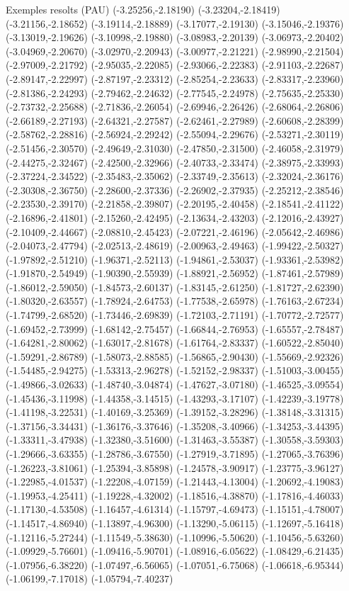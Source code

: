 \documentclass[11pt,a4paper]{article}
\begin{document}
\begin{fmex}{Exemples resolts (PAU)}
(-3.25256,-2.18190) (-3.23204,-2.18419) (-3.21156,-2.18652) (-3.19114,-2.18889) (-3.17077,-2.19130) (-3.15046,-2.19376) (-3.13019,-2.19626) (-3.10998,-2.19880) (-3.08983,-2.20139) (-3.06973,-2.20402) (-3.04969,-2.20670) (-3.02970,-2.20943) (-3.00977,-2.21221) (-2.98990,-2.21504) (-2.97009,-2.21792) (-2.95035,-2.22085) (-2.93066,-2.22383) (-2.91103,-2.22687) (-2.89147,-2.22997) (-2.87197,-2.23312) (-2.85254,-2.23633) (-2.83317,-2.23960) (-2.81386,-2.24293) (-2.79462,-2.24632) (-2.77545,-2.24978) (-2.75635,-2.25330) (-2.73732,-2.25688) (-2.71836,-2.26054) (-2.69946,-2.26426) (-2.68064,-2.26806) (-2.66189,-2.27193) (-2.64321,-2.27587) (-2.62461,-2.27989) (-2.60608,-2.28399) (-2.58762,-2.28816) (-2.56924,-2.29242) (-2.55094,-2.29676) (-2.53271,-2.30119) (-2.51456,-2.30570) (-2.49649,-2.31030) (-2.47850,-2.31500) (-2.46058,-2.31979) (-2.44275,-2.32467) (-2.42500,-2.32966) (-2.40733,-2.33474) (-2.38975,-2.33993) (-2.37224,-2.34522) (-2.35483,-2.35062) (-2.33749,-2.35613) (-2.32024,-2.36176) (-2.30308,-2.36750) (-2.28600,-2.37336) (-2.26902,-2.37935) (-2.25212,-2.38546) (-2.23530,-2.39170) (-2.21858,-2.39807) (-2.20195,-2.40458) (-2.18541,-2.41122) (-2.16896,-2.41801) (-2.15260,-2.42495) (-2.13634,-2.43203) (-2.12016,-2.43927) (-2.10409,-2.44667) (-2.08810,-2.45423) (-2.07221,-2.46196) (-2.05642,-2.46986) (-2.04073,-2.47794) (-2.02513,-2.48619) (-2.00963,-2.49463) (-1.99422,-2.50327) (-1.97892,-2.51210) (-1.96371,-2.52113) (-1.94861,-2.53037) (-1.93361,-2.53982) (-1.91870,-2.54949) (-1.90390,-2.55939) (-1.88921,-2.56952) (-1.87461,-2.57989) (-1.86012,-2.59050) (-1.84573,-2.60137) (-1.83145,-2.61250) (-1.81727,-2.62390) (-1.80320,-2.63557) (-1.78924,-2.64753) (-1.77538,-2.65978) (-1.76163,-2.67234) (-1.74799,-2.68520) (-1.73446,-2.69839) (-1.72103,-2.71191) (-1.70772,-2.72577) (-1.69452,-2.73999) (-1.68142,-2.75457) (-1.66844,-2.76953) (-1.65557,-2.78487) (-1.64281,-2.80062) (-1.63017,-2.81678) (-1.61764,-2.83337) (-1.60522,-2.85040) (-1.59291,-2.86789) (-1.58073,-2.88585) (-1.56865,-2.90430) (-1.55669,-2.92326) (-1.54485,-2.94275) (-1.53313,-2.96278) (-1.52152,-2.98337) (-1.51003,-3.00455) (-1.49866,-3.02633) (-1.48740,-3.04874) (-1.47627,-3.07180) (-1.46525,-3.09554) (-1.45436,-3.11998) (-1.44358,-3.14515) (-1.43293,-3.17107) (-1.42239,-3.19778) (-1.41198,-3.22531) (-1.40169,-3.25369) (-1.39152,-3.28296) (-1.38148,-3.31315) (-1.37156,-3.34431) (-1.36176,-3.37646) (-1.35208,-3.40966) (-1.34253,-3.44395) (-1.33311,-3.47938) (-1.32380,-3.51600) (-1.31463,-3.55387) (-1.30558,-3.59303) (-1.29666,-3.63355) (-1.28786,-3.67550) (-1.27919,-3.71895) (-1.27065,-3.76396) (-1.26223,-3.81061) (-1.25394,-3.85898) (-1.24578,-3.90917) (-1.23775,-3.96127) (-1.22985,-4.01537) (-1.22208,-4.07159) (-1.21443,-4.13004) (-1.20692,-4.19083) (-1.19953,-4.25411) (-1.19228,-4.32002) (-1.18516,-4.38870) (-1.17816,-4.46033) (-1.17130,-4.53508) (-1.16457,-4.61314) (-1.15797,-4.69473) (-1.15151,-4.78007) (-1.14517,-4.86940) (-1.13897,-4.96300) (-1.13290,-5.06115) (-1.12697,-5.16418) (-1.12116,-5.27244) (-1.11549,-5.38630) (-1.10996,-5.50620) (-1.10456,-5.63260) (-1.09929,-5.76601) (-1.09416,-5.90701) (-1.08916,-6.05622) (-1.08429,-6.21435) (-1.07956,-6.38220) (-1.07497,-6.56065) (-1.07051,-6.75068) (-1.06618,-6.95344) (-1.06199,-7.17018) (-1.05794,-7.40237) 
\end{fmex}
\end{document}
